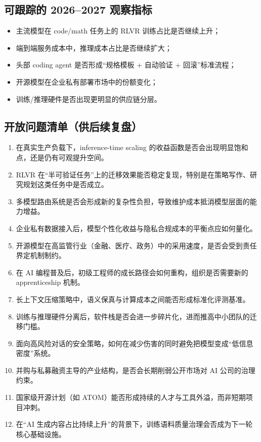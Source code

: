 \documentclass[a4paper]{article}
\begin{document}
\subsection{可跟踪的 2026--2027 观察指标}

\begin{itemize}[leftmargin=1.5em]
    \item 主流模型在 code/math 任务上的 RLVR 训练占比是否继续上升；
    \item 端到端服务成本中，推理成本占比是否继续扩大；
    \item 头部 coding agent 是否形成“规格模板 + 自动验证 + 回滚”标准流程；
    \item 开源模型在企业私有部署市场中的份额变化；
    \item 训练/推理硬件是否出现更明显的供应链分层。
\end{itemize}

\subsection{开放问题清单（供后续复盘）}

\begin{enumerate}[leftmargin=1.8em]
    \item 在真实生产负载下，inference-time scaling 的收益函数是否会出现明显饱和点，还是仍有可观提升空间。
    \item RLVR 在“半可验证任务”上的迁移效果能否稳定复现，特别是在策略写作、研究规划这类任务中是否成立。
    \item 多模型路由系统是否会形成新的复杂性负担，导致维护成本抵消模型层面的能力增益。
    \item 企业私有数据接入后，模型个性化收益与隐私合规成本的平衡点应如何量化。
    \item 开源模型在高监管行业（金融、医疗、政务）中的采用速度，是否会受到责任界定机制制约。
    \item 在 AI 编程普及后，初级工程师的成长路径会如何重构，组织是否需要新的 apprenticeship 机制。
    \item 长上下文压缩策略中，语义保真与计算成本之间能否形成标准化评测基准。
    \item 训练与推理硬件分离后，软件栈是否会进一步碎片化，进而推高中小团队的迁移门槛。
    \item 面向高风险对话的安全策略，如何在减少伤害的同时避免把模型变成“低信息密度”系统。
    \item 并购与私募融资主导的产业结构，是否会长期削弱公开市场对 AI 公司的治理约束。
    \item 国家级开源计划（如 ATOM）能否形成持续的人才与工具外溢，而非短期项目冲刺。
    \item 在“AI 生成内容占比持续上升”的背景下，训练语料质量治理会否成为下一轮核心基础设施。
\end{enumerate}
\end{document}
